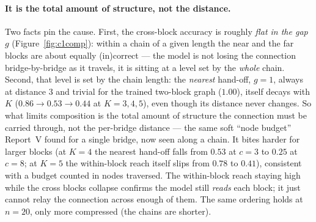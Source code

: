 \documentclass[11pt,a4paper]{article}
\begin{document}
\paragraph{It is the total amount of structure, not the distance.} Two facts pin the cause. First, the
cross-block accuracy is roughly \emph{flat in the gap $g$} (Figure~\ref{fig:c1comp}): within a chain of
a given length the near and the far blocks are about equally (in)correct --- the model is not losing the
connection bridge-by-bridge as it travels, it is sitting at a level set by the \emph{whole} chain.
Second, that level is set by the chain length: the \emph{nearest} hand-off, $g=1$, always at distance
$3$ and trivial for the trained two-block graph ($1.00$), itself decays with $K$ ($0.86\to0.53\to0.44$
at $K=3,4,5$), even though its distance never changes. So what limits composition is the total amount of
structure the connection must be carried through, not the per-bridge distance --- the same soft
``node budget'' Report~V found for a single bridge, now seen along a chain. It bites harder for larger
blocks (at $K=4$ the nearest hand-off falls from $0.53$ at $c=3$ to $0.25$ at $c=8$; at $K=5$ the
within-block reach itself slips from $0.78$ to $0.41$), consistent with a budget counted in nodes
traversed. The within-block reach staying high while the cross blocks collapse confirms the model still
\emph{reads} each block; it just cannot relay the connection across enough of them. The same ordering
holds at $n=20$, only more compressed (the chains are shorter).
\end{document}
